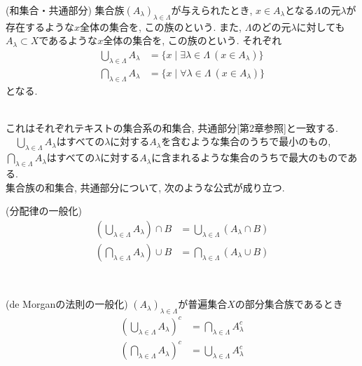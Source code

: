 \documentclass[a4j]{jsarticle}
\begin{document}
\begin{itembox}[l]{ (和集合・共通部分)}
	集合族$(A_\lambda)_{\lambda \in \Lambda}$が与えられたとき, $x \in A_\lambda$となる$\Lambda$の元$\lambda$が存在するような$x$全体の集合を, この族のという. また, $\Lambda$のどの元$\lambda$に対しても$A_\lambda \subset X$であるような$x$全体の集合を, この族のという. それぞれ
	\begin{align}
		\bigcup_{\lambda \in \Lambda}A_\lambda & = \{ x \mid \exists\lambda \in \Lambda\:(x \in A_\lambda) \} \\
		\bigcap_{\lambda \in \Lambda}A_\lambda & = \{ x \mid \forall\lambda \in \Lambda\:(x \in A_\lambda) \}
	\end{align}
	となる.
\end{itembox}\\

これはそれぞれテキスト\cite{text}の集合系の和集合, 共通部分[第2章参照]と一致する. \\


　$\bigcup_{\lambda \in \Lambda}A_\lambda$はすべての$\lambda$に対する$A_\lambda$を含むような集合のうちで最小のもの, $\bigcap_{\lambda \in \Lambda}A_\lambda$はすべての$\lambda$に対する$A_\lambda$に含まれるような集合のうちで最大のものである. \\

集合族の和集合, 共通部分について, 次のような公式が成り立つ. \\

\begin{itembox}[l]{ (分配律の一般化)}
	\begin{align}
		\left( \bigcup_{\lambda \in \Lambda}A_\lambda \right) \cap B & = \bigcup_{\lambda \in \Lambda}(A_\lambda \cap B) \\
		\left( \bigcap_{\lambda \in \Lambda}A_\lambda \right) \cup B & = \bigcap_{\lambda \in \Lambda}(A_\lambda \cup B)
	\end{align}
\end{itembox}\\

\begin{itembox}[l]{ (de Morganの法則の一般化)}
	$(A_\lambda)_{\lambda \in \Lambda}$が普遍集合$X$の部分集合族であるとき
	\begin{align}
		\left( \bigcup_{\lambda \in \Lambda}A_\lambda \right)^c & = \bigcap_{\lambda \in \Lambda}A_\lambda^c \\
		\left( \bigcap_{\lambda \in \Lambda}A_\lambda \right)^c & = \bigcup_{\lambda \in \Lambda}A_\lambda^c
	\end{align}
\end{itembox}\\
\end{document}
